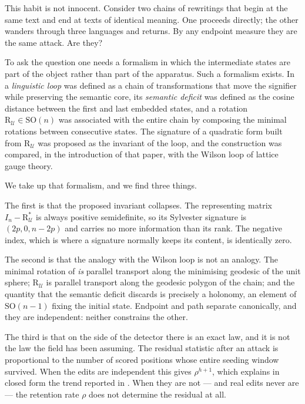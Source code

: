 \documentclass[11pt,a4paper]{article}
\theoremstyle{plain}
\theoremstyle{definition}
\numberwithin{equation}{section}
\newcommand{\SO}{\mathrm{SO}}
\newcommand{\Uc}{\mathcal{U}}
\begin{document}
This habit is not innocent. Consider two chains of rewritings that begin
at the same text and end at texts of identical meaning. One proceeds
directly; the other wanders through three languages and returns. By any
endpoint measure they are the same attack. Are they?

To ask the question one needs a formalism in which the intermediate
states are part of the object rather than part of the apparatus. Such a
formalism exists. In \cite{CM25} a \emph{linguistic loop} was defined as
a chain of transformations that move the signifier while preserving the
semantic core, its \emph{semantic deficit} was defined as the cosine
distance between the first and last embedded states, and a rotation
$\mathrm{R}_\Uc \in \SO(n)$ was associated with the entire chain by
composing the minimal rotations between consecutive states. The
signature of a quadratic form built from $\mathrm{R}_\Uc$ was proposed
as the invariant of the loop, and the construction was compared, in the
introduction of that paper, with the Wilson loop of lattice gauge
theory.

We take up that formalism, and we find three things.

The first is that the proposed invariant collapses. The representing
matrix $I_n - \mathrm{R}^{*}_\Uc$ is always positive semidefinite, so its
Sylvester signature is $(2p,0,n-2p)$ and carries no more information
than its rank. The negative index, which is where a signature normally
keeps its content, is identically zero.

The second is that the analogy with the Wilson loop is not an analogy.
The minimal rotation of \cite{CM25} \emph{is} parallel transport along
the minimising geodesic of the unit sphere; $\mathrm{R}_\Uc$ is parallel
transport along the geodesic polygon of the chain; and the quantity that
the semantic deficit discards is precisely a holonomy, an element of
$\SO(n-1)$ fixing the initial state. Endpoint and path separate
canonically, and they are independent: neither constrains the other.

The third is that on the side of the detector there is an exact law, and
it is not the law the field has been assuming. The residual statistic
after an attack is proportional to the number of scored positions whose
entire seeding window survived. When the edits are independent this
gives $\rho^{h+1}$, which explains in closed form the trend reported in
\cite{KGW24}. When they are not --- and real edits never are --- the
retention rate $\rho$ does not determine the residual at all.
\end{document}
